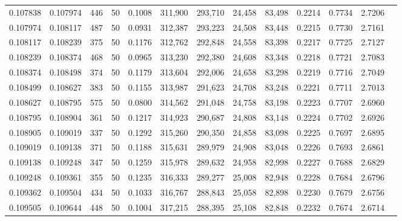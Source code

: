 \begin{tabular}{rrrrrrrrrrrrr}
0.107838 & 0.107974 &   446 &  50 &                                     0.1008 & 311,900 & 293,710 &  24,458 &  83,498 & 0.2214 & 0.7734 & 2.7206 \\
0.107974 & 0.108117 &   487 &  50 &                                     0.0931 & 312,387 & 293,223 &  24,508 &  83,448 & 0.2215 & 0.7730 & 2.7161 \\
0.108117 & 0.108239 &   375 &  50 &                                     0.1176 & 312,762 & 292,848 &  24,558 &  83,398 & 0.2217 & 0.7725 & 2.7127 \\
0.108239 & 0.108374 &   468 &  50 &                                     0.0965 & 313,230 & 292,380 &  24,608 &  83,348 & 0.2218 & 0.7721 & 2.7083 \\
0.108374 & 0.108498 &   374 &  50 &                                     0.1179 & 313,604 & 292,006 &  24,658 &  83,298 & 0.2219 & 0.7716 & 2.7049 \\
0.108499 & 0.108627 &   383 &  50 &                                     0.1155 & 313,987 & 291,623 &  24,708 &  83,248 & 0.2221 & 0.7711 & 2.7013 \\
0.108627 & 0.108795 &   575 &  50 &                                     0.0800 & 314,562 & 291,048 &  24,758 &  83,198 & 0.2223 & 0.7707 & 2.6960 \\
0.108795 & 0.108904 &   361 &  50 &                                     0.1217 & 314,923 & 290,687 &  24,808 &  83,148 & 0.2224 & 0.7702 & 2.6926 \\
0.108905 & 0.109019 &   337 &  50 &                                     0.1292 & 315,260 & 290,350 &  24,858 &  83,098 & 0.2225 & 0.7697 & 2.6895 \\
0.109019 & 0.109138 &   371 &  50 &                                     0.1188 & 315,631 & 289,979 &  24,908 &  83,048 & 0.2226 & 0.7693 & 2.6861 \\
0.109138 & 0.109248 &   347 &  50 &                                     0.1259 & 315,978 & 289,632 &  24,958 &  82,998 & 0.2227 & 0.7688 & 2.6829 \\
0.109248 & 0.109361 &   355 &  50 &                                     0.1235 & 316,333 & 289,277 &  25,008 &  82,948 & 0.2228 & 0.7684 & 2.6796 \\
0.109362 & 0.109504 &   434 &  50 &                                     0.1033 & 316,767 & 288,843 &  25,058 &  82,898 & 0.2230 & 0.7679 & 2.6756 \\
0.109505 & 0.109644 &   448 &  50 &                                     0.1004 & 317,215 & 288,395 &  25,108 &  82,848 & 0.2232 & 0.7674 & 2.6714 \\

\end{tabular}
